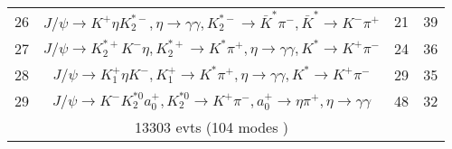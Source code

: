 \begin{table}[htbp]
\begin{center}
\begin{small}
\begin{tabular}{lcll}
 26&$J/\psi       \rightarrow K^{+}          \eta          K_2^{*-}       , \eta           \rightarrow \gamma       \gamma       , K_2^{*-}        \rightarrow \bar{K}^{*}   \pi^{-}        , \bar{K}^{*}    \rightarrow K^{-}          \pi^{+}        $&   21&   39\\
 27&$J/\psi       \rightarrow K_2^{*+}       K^{-}          \eta          , K_2^{*+}        \rightarrow K^{*}          \pi^{+}        , \eta           \rightarrow \gamma       \gamma       , K^{*}           \rightarrow K^{+}          \pi^{-}        $&   24&   36\\
 28&$J/\psi       \rightarrow K_1^{+}        \eta          K^{-}          , K_1^{+}         \rightarrow K^{*}          \pi^{+}        , \eta           \rightarrow \gamma       \gamma       , K^{*}           \rightarrow K^{+}          \pi^{-}        $&   29&   35\\
 29&$J/\psi       \rightarrow K^{-}          K_2^{*0}       a_{0}^{+}      , K_2^{*0}        \rightarrow K^{+}          \pi^{-}        , a_{0}^{+}       \rightarrow \eta          \pi^{+}        , \eta           \rightarrow \gamma       \gamma       $&   48&   32\\
\hline\multicolumn{3}{c}{13303 evts (104 modes )}\\\hline 
\hline\hline
\end{tabular}
\end{small}
\caption{ }
\end{center}
\end{table}

